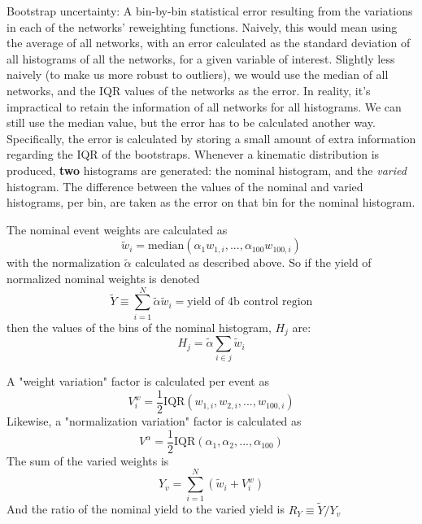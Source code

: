 Bootstrap uncertainty: A bin-by-bin statistical error resulting from the variations in each of the networks' reweighting functions.
Naively, this would mean using the average of all networks, with an error calculated as the standard deviation of all histograms of all the networks, for a given variable of interest.
Slightly less naively (to make us more robust to outliers),
    we would use the median of all networks, and the IQR values of the networks as the error.
In reality, it's impractical to retain the information of all networks for all histograms.
We can still use the median value, but the error has to be calculated another way.
Specifically, the error is calculated by storing a small amount of extra information regarding the IQR of the bootstraps.
Whenever a kinematic distribution is produced, \textbf{two} histograms are generated:
    the nominal histogram, and the \textit{varied} histogram.
The difference between the values of the nominal and varied histograms, per bin,
    are taken as the error on that bin for the nominal histogram.

The nominal event weights are calculated as
    \begin{equation}
    \tilde w_i = \textrm{median}(\alpha_1 w_{1,i}, ..., \alpha_{100} w_{100,i})
    \end{equation}
    with the normalization $\tilde \alpha$ calculated as described above.
So if the yield of normalized nominal weights is denoted
    \begin{equation}
    \tilde Y \equiv \sum_{i=1}^{N} \tilde \alpha \tilde w_i = \textrm{yield of 4b control region}
    \end{equation}
then the values of the bins of the nominal histogram, $H_j$ are:
    \begin{equation}
    H_j = \tilde \alpha \sum_{i \in j} \tilde w_i
    \end{equation}

A "weight variation" factor is calculated per event as 
    \begin{equation}
    V^w_i = \frac{1}{2}\textrm{IQR}(w_{1,i}, w_{2,i}, ..., w_{100,i})
    \end{equation}
Likewise, a "normalization variation" factor is calculated as
    \begin{equation}
    V^{\alpha} = \frac{1}{2}\textrm{IQR}(\alpha_{1}, \alpha_{2}, ..., \alpha_{100})
    \end{equation}
The sum of the varied weights is 
    \begin{equation}
    Y_v = \sum_{i=1}^{N} \left( \tilde w_i + V^w_i \right)
    \end{equation}
And the ratio of the nominal yield to the varied yield is $R_Y \equiv \tilde Y / Y_v$

